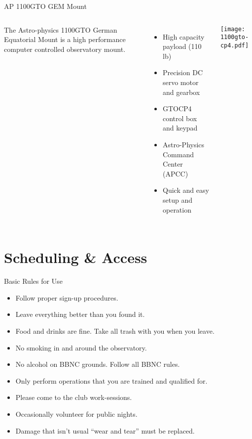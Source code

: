 



\begin{frame}{AP 1100GTO GEM Mount}
  \begin{columns}[T,onlytextwidth]
      The Astro-physics 1100GTO German Equatorial Mount is a high performance
      computer controlled observatory mount.\\[2ex]

      \begin{itemize}
        \item High capacity payload (110 lb)
        \item Precision DC servo motor and gearbox 
        \item GTOCP4 control box and keypad
        \item Astro-Physics Command Center (APCC)
        \item Quick and easy setup and operation
      \end{itemize}

      \texttt{[image: 1100gto-cp4.pdf]}

  \end{columns}
\end{frame}


\section{Scheduling \& Access}

\begin{frame}{Basic Rules for Use}
  \Large
  \begin{itemize}
    \item Follow proper sign-up procedures.
    \item Leave everything better than you found it.
    \item Food and drinks are fine. Take all trash with you when you leave.
    \item No smoking in and around the observatory.
    \item No alcohol on BBNC grounds. Follow all BBNC rules.
    \item Only perform operations that you are trained and qualified for.
    \item Please come to the club work-sessions.
    \item Occasionally volunteer for public nights.
    \item Damage that isn't usual ``wear and tear'' must be replaced.
  \end{itemize}
\end{frame}

